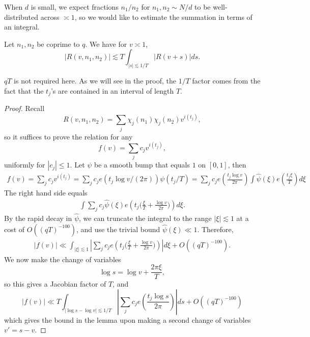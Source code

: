 When $d$ is small, we expect fractions $n_1/n_2$ for $n_1,n_2\sim N/d$ to be well-distributed across $\asymp 1$, so we would like to estimate the summation in terms of an integral. 
\begin{lemma}
    Let $n_1,n_2$ be coprime to $q$. We have for $v\asymp 1$,
    \[
    |R(v,n_1,n_2)|\lesssim T\int_{|s|\lesssim 1/T} |R(v+s)|ds.
    \]
\end{lemma}
\begin{remark}
	$qT$ is not required here. As we will see in the proof, the $1/T$ factor comes from the fact that the $t_j$'s are contained in an interval of length $T$.
\end{remark}
\begin{proof}
    Recall \[
    R(v,n_1,n_2)=\sum_j \chi_j(n_1)\chi_j(n_2)v^{i(t_j)},
    \]
    so it suffices to prove the relation for any \[
    f(v) = \sum_j c_j v^{i(t_j)},
    \]
    uniformly for $|c_j|\leq 1$. Let $\psi$ be a smooth bump that equals $1$ on $[0,1]$, then \begin{align*}
        f(v) = \sum_j c_j v^{i(t_j)} = \sum_j c_j e(t_j\log v/(2\pi))\psi(t_j/T) =  \sum_j c_j e\left(\frac{t_j\log v}{2\pi}\right)\int \hat\psi(\xi)e\left(\frac{t_j\xi}{T}\right)d\xi
    \end{align*}
    The right hand side equals \begin{align*}
        \int \sum_j c_j  \hat\psi(\xi)e\left(t_j\Big(\frac{\xi}{T} +\frac{\log v}{2\pi}\Big)\right)d\xi.
    \end{align*}
    By the rapid decay in $\hat\psi$, we can truncate the integral to the range $|\xi|\lesssim 1$ at a cost of $O((qT)^{-100})$, and use the trivial bound $\hat\psi(\xi)\ll 1$.
    Therefore, \begin{align*}
        |f(v)|\ll \int_{|\xi|\lesssim 1}\left| \sum_j c_j  e\left(t_j\Big(\frac{\xi}{T} +\frac{\log v}{2\pi}\Big)\right)\right|d\xi +O((qT)^{-100}).
    \end{align*}
    We now make the change of variables \[
    \log s= \log v + \frac{2\pi\xi}{T},
    \]
    so this gives a Jacobian factor of $T$, and \[
        |f(v)|\ll T \int_{|\log s-\log v|\lesssim 1/T}\left| \sum_j c_j  e\left(\frac{t_j\log s}{2\pi}\right)\right|ds +O((qT)^{-100})\]
        which gives the bound in the lemma upon making a second change of variables $v'=s-v$.
\end{proof}

